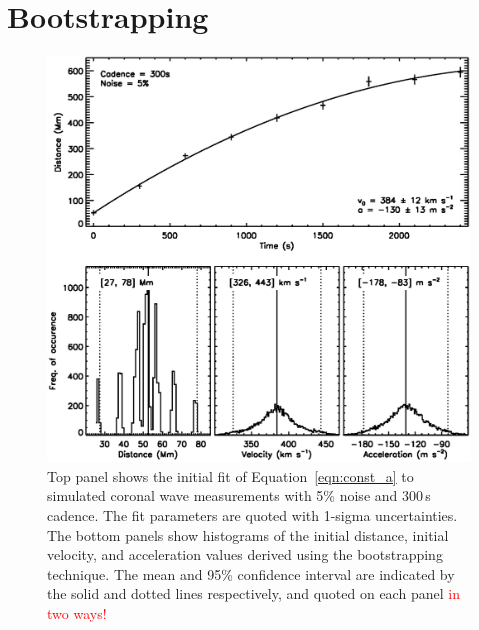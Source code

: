\documentclass[structabstract]{aa}
\begin{document}
\section{Bootstrapping}
\label{sect:simul2}

\begin{figure}
\begin{center}
\includegraphics[scale=0.45, trim=20 50 0 0, clip=true]{images/cad_boot_weight_5percent_300s.eps}
\caption{Top panel shows the initial fit of Equation~\ref{eqn:const_a} to simulated coronal wave measurements with 5\% noise and 300\,s cadence. The fit parameters are quoted with 1-sigma uncertainties. The bottom panels show histograms of the initial distance, initial velocity, and acceleration values derived using the bootstrapping technique. The mean and 95\% confidence interval are indicated by the solid and dotted lines respectively, and quoted on each panel \textcolor{red}{in two ways!}}
\label{cad_boot_weight}
\end{center}
\end{figure}
\end{document}
